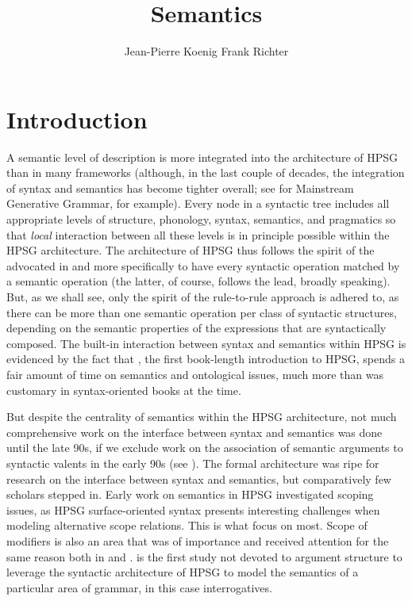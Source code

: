 \documentclass[output=paper
	        ,collection
	        ,collectionchapter
 	        ,biblatex
                ,babelshorthands
                ,newtxmath
                ,draftmode
                ,colorlinks, citecolor=brown
]{langscibook}
\author{%
	Jean-Pierre Koenig\affiliation{University at Buffalo}%
	\lastand Frank Richter\affiliation{Goethe Universität Frankfurt}%
}
\title{Semantics}
\begin{document}
\maketitle
\label{chap-semantics}

\section{Introduction} 

A semantic level of description is more integrated into the architecture of HPSG than in many frameworks  (although, in the last couple of decades, the integration of syntax and semantics has become tighter overall; see \citealt{HeimandKratzer1998} for Mainstream Generative Grammar, for example). Every node in a syntactic tree includes  all appropriate levels of structure, phonology, syntax, semantics, and pragmatics so that \emph{local} interaction between all these levels is in principle possible within the HPSG architecture. The architecture of HPSG thus follows the spirit of the  advocated in \citet{Bach1976} and more specifically \citet{KleinandSag1985} to have every syntactic operation matched by a semantic operation (the latter, of course, follows the  lead, broadly speaking). But, as we shall see, only the spirit of the rule-to-rule approach is adhered to, as there can be more than one semantic operation per class of syntactic structures, depending on the semantic properties of the expressions that are syntactically composed. The built-in interaction between syntax and semantics within HPSG is evidenced by the fact that \citet{PollardandSag1987}, the first book-length introduction to HPSG, spends a fair amount of time on semantics and ontological issues, much more than was customary in syntax-oriented books at the time.

But despite the centrality of semantics within the HPSG architecture, not much comprehensive work on the interface between syntax and semantics was done  until the late 90s, if we exclude work on the association of semantic arguments to syntactic valents in the early 90s (see ). The formal architecture was ripe for research on the interface between syntax and semantics, but comparatively few scholars stepped in. 
Early work on semantics in HPSG investigated scoping issues, as HPSG surface-oriented syntax presents interesting challenges when modeling alternative scope relations. This is what \citet{PollardandSag1987, PollardandSag1994} focus on most. Scope of modifiers is also an area that was of importance and received attention for the same reason both in \citet{PollardandSag1994} and \citet{Kasper1997}. \cite{GinzburgandSag2001} is the first study not devoted to argument structure to leverage the syntactic architecture of HPSG to model the semantics of a particular area of grammar, in this case interrogatives. 
\end{document}
